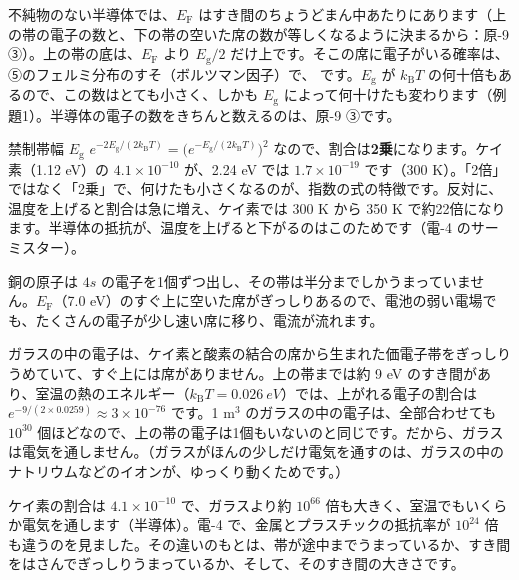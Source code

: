 不純物のない半導体では、$E_{\mathrm F}$ はすき間のちょうどまん中あたりにあります（上の帯の電子の数と、下の帯の空いた席の数が等しくなるように決まるから：原-9 ③）。上の帯の底は、$E_{\mathrm F}$ より $E_{\mathrm g}/2$ だけ上です。そこの席に電子がいる確率は、⑤のフェルミ分布のすそ（ボルツマン因子）で、
\label{ph:原-8:egfactor}です。$E_{\mathrm g}$ が $k_{\mathrm B}T$ の何十倍もあるので、この数はとても小さく、しかも $E_{\mathrm g}$ によって何十けたも変わります（例題1）。半導体の電子の数をきちんと数えるのは、原-9 ③です。

\begin{phbaisuru}{禁制帯幅 $E_{\mathrm g}$}
$e^{-2E_{\mathrm g}/(2k_{\mathrm B}T)}=\bigl(e^{-E_{\mathrm g}/(2k_{\mathrm B}T)}\bigr)^2$ なので、割合は\textbf{2乗}になります。ケイ素（1.12 eV）の $4.1\times10^{-10}$ が、2.24 eV では $1.7\times10^{-19}$ です（300 K）。「2倍」ではなく「2乗」で、何けたも小さくなるのが、指数の式の特徴です。反対に、温度を上げると割合は急に増え、ケイ素では 300 K から 350 K で約22倍になります。半導体の抵抗が、温度を上げると下がるのはこのためです（電-4 のサーミスター）。
\end{phbaisuru}

\label{ph:原-8:sec9}
\label{ph:原-8:hatena}銅の原子は $4s$ の電子を1個ずつ出し、その帯は半分までしかうまっていません。$E_{\mathrm F}$（7.0 eV）のすぐ上に空いた席がぎっしりあるので、電池の弱い電場でも、たくさんの電子が少し速い席に移り、電流が流れます。

ガラスの中の電子は、ケイ素と酸素の結合の席から生まれた価電子帯をぎっしりうめていて、すぐ上には席がありません。上の帯までは約 9 eV のすき間があり、室温の熱のエネルギー（$k_{\mathrm B}T=\qty{0.026}{eV}$）では、上がれる電子の割合は $e^{-9/(2\times0.0259)}\approx3\times10^{-76}$ です。1 m$^3$ のガラスの中の電子は、全部合わせても $10^{30}$ 個ほどなので、上の帯の電子は1個もいないのと同じです。だから、ガラスは電気を通しません。（ガラスがほんの少しだけ電気を通すのは、ガラスの中のナトリウムなどのイオンが、ゆっくり動くためです。）

ケイ素の割合は $4.1\times10^{-10}$ で、ガラスより約 $10^{66}$ 倍も大きく、室温でもいくらか電気を通します（半導体）。電-4 で、金属とプラスチックの抵抗率が $10^{24}$ 倍も違うのを見ました。その違いのもとは、帯が途中までうまっているか、すき間をはさんでぎっしりうまっているか、そして、そのすき間の大きさです。

\phkokomade

